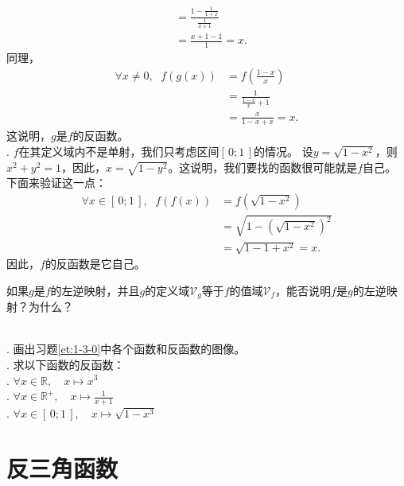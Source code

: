 \documentclass[12pt,UTF8,fontset=none]{ctexbook}
\begin{document}
\begin{so}
\begin{align*}
                                  &= \frac{1 - \frac{1}{1 + x}}{\frac{1}{x + 1}}  \\
                                  &= \frac{x + 1 - 1}{1} = x. 
    \end{align*} 
    同理，
    \begin{align*}
        \forall x \neq 0, \;\,\, f(g(x)) &= f\left(\frac{1 - x}{x}\right)  \\
                                  &= \frac{1}{\frac{1 - x}{x} + 1}  \\
                                  &= \frac{x}{1 - x + x} = x. 
    \end{align*} 
    这说明，$g$是$f$的反函数。\\  
    . $f$在其定义域内不是单射，我们只考虑区间$[\,0;1\,]$的情况。
    设$y = \sqrt{1 - x^2}$，则$x^2 + y^2 = 1$，因此，$x = \sqrt{1 - y^2}$。这说明，我们要找的函数很可能就是$f$自己。
    下面来验证这一点：
    \begin{align*}
        \forall x\in [\,0;1\,], \;\,\, f(f(x)) &= f\left(\sqrt{1 - x^2}\right)  \\
                                  &= \sqrt{1 - \left(\sqrt{1 - x^2}\right)^2}  \\
                                  &= \sqrt{1 - 1 + x^2} = x. 
    \end{align*} 
    因此，$f$的反函数是它自己。
\end{so}

\begin{sk}
    如果$g$是$f$的左逆映射，并且$g$的定义域$\mathcal{V}_g$等于$f$的值域$\mathcal{V}_f$，能否说明$f$是$g$的左逆映射？为什么？
\end{sk}
\begin{xt}
    \mbox{} \\
    . 画出习题\ref{et:1-3-0}中各个函数和反函数的图像。\\
    . 求以下函数的反函数：\\
    . $\forall x\in \mathbb{R}, \quad x\mapsto x^3$ \\
    . $\forall x\in \mathbb{R}^+, \quad x\mapsto \frac{1}{x + 1}$ \\
    . $\forall x\in [\,0;1\,], \quad x\mapsto \sqrt{1 - x^3} $
\end{xt}

\section{反三角函数}
\end{document}
